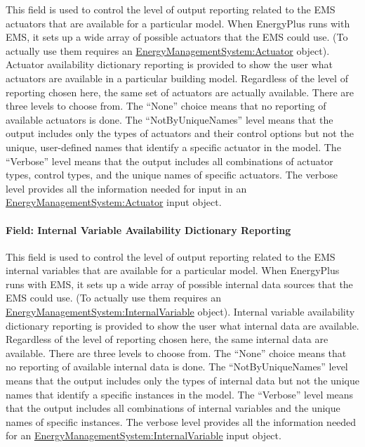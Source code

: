 This field is used to control the level of output reporting related to the EMS actuators that are available for a particular model. When EnergyPlus runs with EMS, it sets up a wide array of possible actuators that the EMS could use. (To actually use them requires an \hyperref[energymanagementsystemactuator]{EnergyManagementSystem:Actuator} object). Actuator availability dictionary reporting is provided to show the user what actuators are available in a particular building model. Regardless of the level of reporting chosen here, the same set of actuators are actually available. There are three levels to choose from. The ``None'' choice means that no reporting of available actuators is done. The ``NotByUniqueNames'' level means that the output includes only the types of actuators and their control options but not the unique, user-defined names that identify a specific actuator in the model. The ``Verbose'' level means that the output includes all combinations of actuator types, control types, and the unique names of specific actuators. The verbose level provides all the information needed for input in an \hyperref[energymanagementsystemactuator]{EnergyManagementSystem:Actuator} input object.

\paragraph{Field: Internal Variable Availability Dictionary Reporting}\label{field-internal-variable-availability-dictionary-reporting}

This field is used to control the level of output reporting related to the EMS internal variables that are available for a particular model. When EnergyPlus runs with EMS, it sets up a wide array of possible internal data sources that the EMS could use. (To actually use them requires an \hyperref[energymanagementsysteminternalvariable]{EnergyManagementSystem:InternalVariable} object). Internal variable availability dictionary reporting is provided to show the user what internal data are available. Regardless of the level of reporting chosen here, the same internal data are available. There are three levels to choose from. The ``None'' choice means that no reporting of available internal data is done. The ``NotByUniqueNames'' level means that the output includes only the types of internal data but not the unique names that identify a specific instances in the model. The ``Verbose'' level means that the output includes all combinations of internal variables and the unique names of specific instances. The verbose level provides all the information needed for an \hyperref[energymanagementsysteminternalvariable]{EnergyManagementSystem:InternalVariable} input object.

